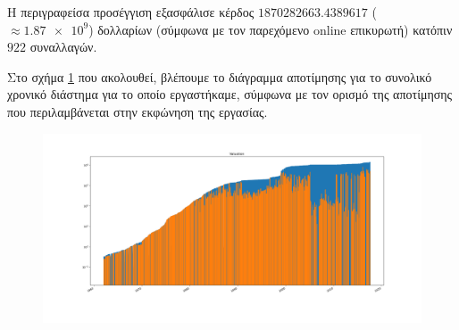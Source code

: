Η περιγραφείσα προσέγγιση εξασφάλισε κέρδος $1870282663.4389617$ ($\approx \num{1.87e+9}$) δολλαρίων (σύμφωνα με τον παρεχόμενο online επικυρωτή) κατόπιν $922$ συναλλαγών.

Στο σχήμα \ref{fig:valuation_small} που ακολουθεί, βλέπουμε το διάγραμμα αποτίμησης για το συνολικό χρονικό διάστημα για το οποίο εργαστήκαμε, σύμφωνα με τον ορισμό της αποτίμησης που περιλαμβάνεται στην εκφώνηση της εργασίας.


\begin{figure}[H]
\centering
\includegraphics[width=1.1\linewidth]{images/small.png}
\label{fig:valuation_small}
\end{figure}

